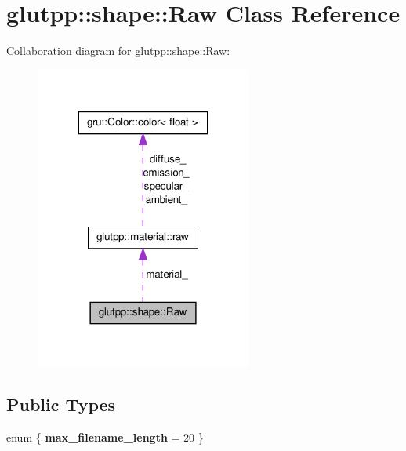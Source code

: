 \hypertarget{classglutpp_1_1shape_1_1Raw}{\section{glutpp\-:\-:shape\-:\-:\-Raw \-Class \-Reference}
\label{classglutpp_1_1shape_1_1Raw}
}


\-Collaboration diagram for glutpp\-:\-:shape\-:\-:\-Raw\-:\nopagebreak
\begin{figure}[H]
\begin{center}
\leavevmode
\includegraphics[width=202pt]{classglutpp_1_1shape_1_1Raw__coll__graph}
\end{center}
\end{figure}
\subsection*{\-Public \-Types}
\begin{DoxyCompactItemize}
\item 
enum \{ {\bfseries max\-\_\-filename\-\_\-length} =  20
 \}
\end{DoxyCompactItemize}
